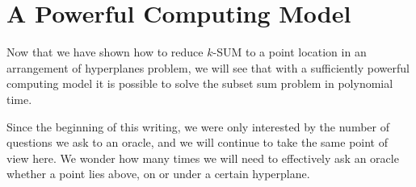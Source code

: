 \section{A Powerful Computing Model}

Now that we have shown how to reduce $k$-SUM to a point location in an
arrangement of hyperplanes problem, we will see that with a sufficiently
powerful computing model it is possible to solve the subset sum problem in
polynomial time.

Since the beginning of this writing, we were only interested by the number of
questions we ask to an oracle, and we will continue to take the same point of
view here. We wonder how many times we will need to effectively ask an oracle
whether a point lies above, on or under a certain hyperplane.
